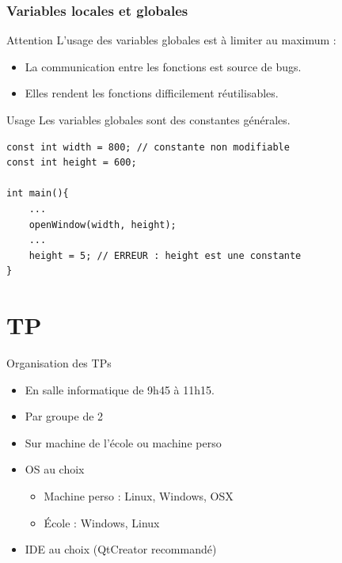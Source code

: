 \begin{frame}[fragile]
	\frametitle{Variables locales et globales}

\begin{alert}{Attention}
	L'usage des variables globales est à limiter au maximum :
	\begin{itemize}
		\item La communication entre les fonctions est source de bugs.
		\item Elles rendent les fonctions difficilement réutilisables.
	\end{itemize}
\end{alert}

\begin{block}{Usage}
	Les variables globales sont des constantes générales.
\end{block}

\begin{verbatim}
const int width = 800; // constante non modifiable
const int height = 600;

int main(){
    ...
    openWindow(width, height);
    ...
    height = 5; // ERREUR : height est une constante
}
\end{verbatim}

\end{frame}


\section{TP}

\begin{frame}{Organisation des TPs}
    \begin{itemize}
        \item En salle informatique de 9h45 à 11h15.
        \item Par groupe de 2
        \item Sur machine de l'école ou machine perso
        \item OS au choix
            \begin{itemize}
                \item Machine perso : Linux, Windows, OSX
                \item École : Windows, Linux
            \end{itemize}
        \item IDE au choix (QtCreator recommandé)
    \end{itemize}
\end{frame}

